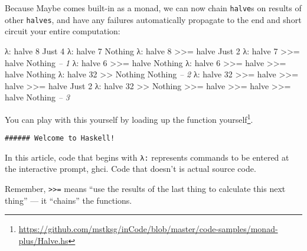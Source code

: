 \documentclass[]{article}
\newenvironment{Shaded}{}{}
\newcommand{\DataTypeTok}[1]{\textcolor[rgb]{0.56,0.13,0.00}{{#1}}}
\newcommand{\DecValTok}[1]{\textcolor[rgb]{0.25,0.63,0.44}{{#1}}}
\newcommand{\CommentTok}[1]{\textcolor[rgb]{0.38,0.63,0.69}{\textit{{#1}}}}
\newcommand{\FunctionTok}[1]{\textcolor[rgb]{0.02,0.16,0.49}{{#1}}}
\newcommand{\NormalTok}[1]{{#1}}
\renewcommand{\href}[2]{#2\footnote{\url{#1}}}
\begin{document}
Because Maybe comes built-in as a monad, we can now chain \texttt{halve}s on results of other
\texttt{halves}, and have any failures automatically propagate to the end and short circuit your
entire computation:

\begin{Shaded}
\begin{Highlighting}[]
\NormalTok{λ}\FunctionTok{:} \NormalTok{halve }\DecValTok{8}
\DataTypeTok{Just} \DecValTok{4}
\NormalTok{λ}\FunctionTok{:} \NormalTok{halve }\DecValTok{7}
\DataTypeTok{Nothing}
\NormalTok{λ}\FunctionTok{:} \NormalTok{halve }\DecValTok{8} \FunctionTok{>>=} \NormalTok{halve}
\DataTypeTok{Just} \DecValTok{2}
\NormalTok{λ}\FunctionTok{:} \NormalTok{halve }\DecValTok{7} \FunctionTok{>>=} \NormalTok{halve}
\DataTypeTok{Nothing}                         \CommentTok{-- 1}
\NormalTok{λ}\FunctionTok{:} \NormalTok{halve }\DecValTok{6} \FunctionTok{>>=} \NormalTok{halve}
\DataTypeTok{Nothing}
\NormalTok{λ}\FunctionTok{:} \NormalTok{halve }\DecValTok{6} \FunctionTok{>>=} \NormalTok{halve }\FunctionTok{>>=} \NormalTok{halve}
\DataTypeTok{Nothing}
\NormalTok{λ}\FunctionTok{:} \NormalTok{halve }\DecValTok{32} \FunctionTok{>>} \DataTypeTok{Nothing}
\DataTypeTok{Nothing}                         \CommentTok{-- 2}
\NormalTok{λ}\FunctionTok{:} \NormalTok{halve }\DecValTok{32} \FunctionTok{>>=} \NormalTok{halve }\FunctionTok{>>=} \NormalTok{halve }\FunctionTok{>>=} \NormalTok{halve}
\DataTypeTok{Just} \DecValTok{2}
\NormalTok{λ}\FunctionTok{:} \NormalTok{halve }\DecValTok{32} \FunctionTok{>>} \DataTypeTok{Nothing} \FunctionTok{>>=} \NormalTok{halve }\FunctionTok{>>=} \NormalTok{halve }\FunctionTok{>>=} \NormalTok{halve}
\DataTypeTok{Nothing}                         \CommentTok{-- 3}
\end{Highlighting}
\end{Shaded}

You can play with this yourself by
\href{https://github.com/mstksg/inCode/blob/master/code-samples/monad-plus/Halve.hs}{loading up the
function yourself}.

\begin{verbatim}
###### Welcome to Haskell!
\end{verbatim}

In this article, code that begins with \texttt{λ:} represents commands to be entered at the
interactive prompt, ghci. Code that doesn't is actual source code.

Remember, \texttt{\textgreater{}\textgreater{}=} means ``use the results of the last thing to
calculate this next thing'' --- it ``chains'' the functions.
\end{document}
